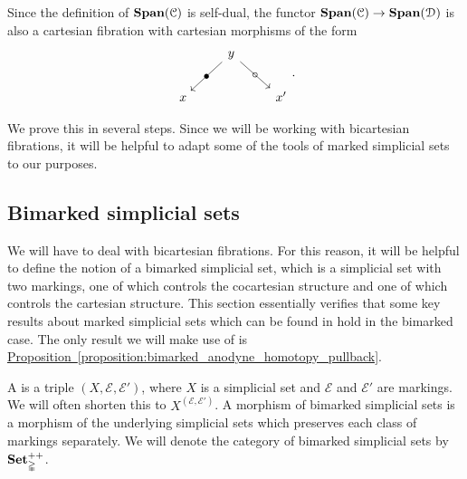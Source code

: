 \documentclass[main.tex]{subfiles}
\begin{document}
\begin{note}
  Since the definition of $\mathbf{Span}(\mathcal{C})$ is self-dual, the functor $\mathbf{Span}(\mathcal{C}) \to \mathbf{Span}(\mathcal{D})$ is also a cartesian fibration with cartesian morphisms of the form
  \begin{equation*}
    \begin{tikzcd}
      & y
      \arrow[dl, "\bullet" marking]
      \arrow[dr, "\circ" marking]
      \\
      x
      && x'
    \end{tikzcd}.
  \end{equation*}
\end{note}

We prove this in several steps. Since we will be working with bicartesian fibrations, it will be helpful to adapt some of the tools of marked simplicial sets to our purposes.

\subsection{Bimarked simplicial sets}
\label{ssc:bimarked_simplicial_sets}

We will have to deal with bicartesian fibrations. For this reason, it will be helpful to define the notion of a bimarked simplicial set, which is a simplicial set with two markings, one of which controls the cocartesian structure and one of which controls the cartesian structure. This section essentially verifies that some key results about marked simplicial sets which can be found in \cite[Sec.\ 3.1]{highertopostheory} hold in the bimarked case. The only result we will make use of is \hyperref[proposition:bimarked_anodyne_homotopy_pullback]{Proposition~\ref*{proposition:bimarked_anodyne_homotopy_pullback}}.

\begin{definition}
  A  is a triple $(X, \mathcal{E}, \mathcal{E}')$, where $X$ is a simplicial set and $\mathcal{E}$ and $\mathcal{E}'$ are markings. We will often shorten this to $X^{(\mathcal{E}, \mathcal{E}')}$. A morphism of bimarked simplicial sets is a morphism of the underlying simplicial sets which preserves each class of markings separately. We will denote the category of bimarked simplicial sets by $\mathbf{Set}_{\mathbb{\Delta}}^{++}$.
\end{definition}
\end{document}
